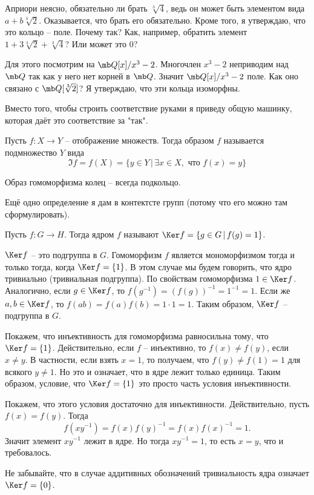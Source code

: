 Априори неясно, обязательно ли  брать $\sqrt[3]{4}$, ведь он может быть элементом вида $a+b\sqrt[3]{2}$. Оказывается, что брать его обязательно. Кроме того, я утверждаю, что  это кольцо --  поле. Почему так? Как, например, обратить элемент $1+3\sqrt[3]{2}+\sqrt[3]{4}$? Или может это 0?

Для этого посмотрим на $\mb Q[x]/x^3-2$. Многочлен $x^3-2$ неприводим над $\mb Q$ так как у него нет корней в $\mb Q$. Значит  $\mb Q[x]/x^3-2$ поле. Как оно связано с $\mb Q[\sqrt[3]{2}]$? Я утверждаю, что эти кольца изоморфны.

Вместо того, чтобы строить соответствие руками я приведу общую машинку, которая даёт это соответствие за "так". 

\dfn Пусть $f\colon X \to Y$ -- отображение множеств. Тогда образом $f$ называется подмножество $Y$ вида
$$\Im f= f(X)=\{y \in Y\, |\, \exists x \in X, \text{ что } f(x)=y\}$$
\edfn

\rm Образ гомоморфизма колец -- всегда подкольцо. 
\erm

Ещё одно определение я дам в контектсте групп (потому что его можно там сформулировать).

\dfn Пусть $f\colon G \to H$. Тогда ядром $f$ называют $\Ker f=\{g\in G\,|\, f(g)=1\}$.
\edfn

\lm $\Ker f$ -- это подгруппа в $G$. Гомоморфизм $f$ является мономорфизмом тогда и только тогда, когда $\Ker f=\{1\}$. В этом случае мы будем говорить, что  ядро тривиально (тривиальная подгруппа).
\elm
\proof По свойствам гомоморфизма $1\in \Ker f$. Аналогично, если $g \in \Ker f$, то $f(g^{-1})=(f(g))^{-1}=1^{-1}=1.$ Если же $a,b\in \Ker f$, то $f(ab)=f(a)f(b)=1\cdot 1=1$. Таким образом, $\Ker f $ -- подгруппа в $G$. 

Покажем, что инъективность для гомоморфизма равносильна тому, что $\Ker f=\{1\}$. Действительно, если $f$ -- инъективно, то $f(x)\neq f(y)$, если $x\neq y$. В частности, если взять $x=1$, то получаем, что $f(y)\neq f(1)=1$ для всякого $y\neq 1$. Но это и означает, что  в ядре лежит только единица.  
Таким образом, условие, что $\Ker f=\{1\}$ это просто часть условия инъективности.

Покажем, что этого условия достаточно для инъективности. Действительно, пусть $f(x)=f(y)$. Тогда $$f(xy^{-1})=f(x)f(y)^{-1}=f(x)f(x)^{-1}=1.$$
Значит элемент $xy^{-1}$ лежит в ядре. Но тогда $xy^{-1}=1$, то есть $x=y$, что и требовалось.
\endproof

\rm Не забывайте, что в случае аддитивных обозначений тривиальность ядра означает $\Ker f=\{0\}$.
\erm

